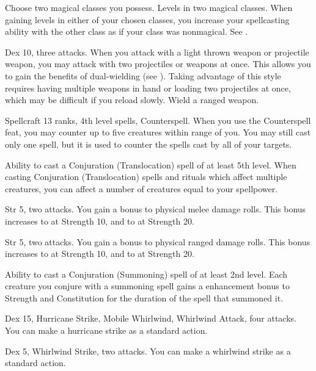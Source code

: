 Choose two magical classes you possess.
\featpres
Levels in two magical classes.
\featben When gaining levels in either of your chosen classes, you increase your spellcasting ability with the other class as if your class was nonmagical.
See .

\featpres Dex 10, three attacks.
\featben When you attack with a light thrown weapon or projectile weapon, you may attack with two projectiles or weapons at once.
This allows you to gain the benefits of dual-wielding (see ).
Taking advantage of this style requires having multiple weapons in hand or loading two projectiles at once, which may be difficult if you reload slowly.
\stylereq Wield a ranged weapon.

\featpres Spellcraft 13 ranks, 4th level spells, Counterspell.
\featben When you use the Counterspell feat, you may counter up to five creatures within \rngmed range of you.
You may still cast only one spell, but it is used to counter the spells cast by all of your targets.

\featpre Ability to cast a Conjuration (Translocation) spell of at least 5th level.
\featben When casting Conjuration (Translocation) spells and rituals which affect multiple creatures, you can affect a number of creatures equal to your spellpower.

\featpres Str 5, two attacks.
\featben You gain a  bonus to physical melee damage rolls.
This bonus increases to  at Strength 10, and to  at Strength 20.

\featpres Str 5, two attacks.
\featben You gain a  bonus to physical ranged damage rolls.
This bonus increases to  at Strength 10, and to  at Strength 20.

\featpre Ability to cast a Conjuration (Summoning) spell of at least 2nd level.
\featben Each creature you conjure with a summoning spell gains a  enhancement bonus to Strength and Constitution for the duration of the spell that summoned it.

\featpres Dex 15, Hurricane Strike, Mobile Whirlwind, Whirlwind Attack, four attacks.
\featben You can make a hurricane strike as a standard action.

\featpres Dex 5, Whirlwind Strike, two attacks.
\featben You can make a whirlwind strike as a standard action.

